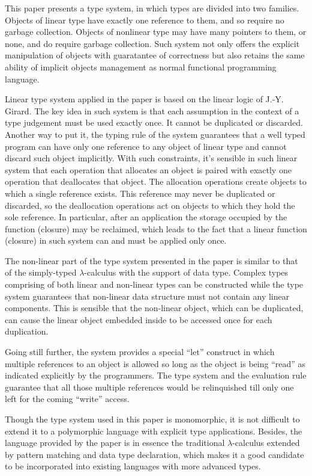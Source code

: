 \documentclass{llncs}
\begin{document}
This paper presents a type system, in which types are divided into two families.
Objects of linear type have exactly one reference to them, and so require no garbage
collection. Objects of nonlinear type may have many pointers to them, or none, and
do require garbage collection.  Such system not only offers the explicit 
manipulation of objects with guaratantee of correctness but 
also retains the same ability of implicit objects
management as normal functional programming language. 

Linear type system applied in the paper is based on the linear logic
of J.-Y. Girard. The key idea in such system is that each assumption in the context of a
type judgement must be used exactly once. It cannot be duplicated or discarded.
Another way to put it, the typing rule of the system guarantees that a well
typed program can have only one reference to any object of linear type
and cannot discard such object implicitly.
With such constraints, it's sensible in such linear system that
each operation that allocates an object is paired with exactly one operation
that deallocates that object. The allocation operations create objects to which
a single reference exists. This reference may never be duplicated or discarded,
so the deallocation operations act on objects to which they hold the sole
reference. In particular, after an application the storage occupied by the function
(closure) may be reclaimed, which leads to the fact that a linear function
(closure) in such system can and must be applied only once.

The non-linear part of the type system presented in the paper is similar to that
of the simply-typed $\lambda$-calculus with the support of data type. 
Complex types comprising of both linear and non-linear types can be constructed while
the type system guarantees that non-linear data structure must not 
contain any linear components. This is sensible that the non-linear object,
which can be duplicated, can cause the linear object embedded inside to be
accessed once for each duplication.

Going still further, the system provides a
special ``let'' construct in which multiple references to an object is
allowed so long as the object is being ``read'' as indicated explicitly by the
programmers. The type system and the evaluation rule guarantee that all
those multiple references would be relinquished till only one left for the
coming ``write'' access.

Though the type system used in this paper is monomorphic, it is not difficult to
extend it to a polymorphic language with explicit type applications.
Besides, the language provided by the paper is in essence the traditional
$\lambda$-calculus
extended by pattern matching and data type declaration, which makes it a
good candidate to be incorporated into existing languages with more
advanced types.
\end{document}
